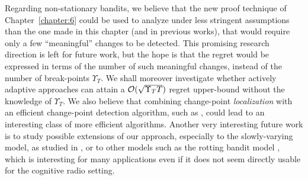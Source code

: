 Regarding non-stationary bandits, we believe that the new proof technique of Chapter~\ref{chapter:6} could be used to analyze \GLRklUCB{} under less stringent assumptions than the one made in this chapter (and in previous works), that would require only a few ``meaningful'' changes to be detected.
This promising research direction is left for future work,  but the hope is that the regret would be expressed in terms of the number of such meaningful changes, instead of the number of break-points $\Upsilon_T$.
We shall moreover investigate whether actively adaptive approaches can attain a $\mathcal{O}(\sqrt{\Upsilon_T T})$ regret upper-bound without the knowledge of $\Upsilon_T$.
We also believe that combining change-point \emph{localization} with an efficient change-point detection algorithm, such as \GLRklUCB, could lead to an interesting class of more efficient algorithms.
Another very interesting future work is to study possible extensions of our approach, especially to the slowly-varying model, as studied in \cite{Besbes14stochastic,Louedec16,WeiSrivastava18Abruptly}, or to other models such as the rotting bandit model \cite{Seznec2018}, which is interesting for many applications even if it does not seem directly usable for the cognitive radio setting.




